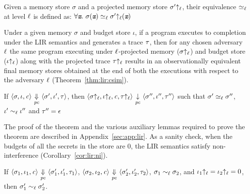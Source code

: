 \begin{mydef}
\label{def:lir:simseq}
Given a memory store $\sigma$ and a projected memory store
$\sigma'{\uparrow_\ell}$, their equivalence $\simeq_\ell$ at level
$\ell$ is defined as: 
$\forall \emph{\texttt{x}}.~ \sigma(\emph{\texttt{x}}) \simeq_\ell
\sigma'{\uparrow_\ell}(\emph{\texttt{x}})$ 
\end{mydef}


Under a given memory $\sigma$ and budget store
$\iota$, if a program executes to completion under the LIR semantics
and generates a trace $\tau$, then for any chosen adversary
$\ell$ the same program executing under $\ell$-projected 
memory ($\sigma{\uparrow_\ell}$) and budget store ($\iota{\uparrow_\ell}$) along with the
projected trace $\tau{\uparrow_\ell}$ results in an observationally equivalent
final memory stores obtained at the end of both the executions with
respect to the adversary $\ell$ (Theorem~\ref{thm:lir:csim}).

\begin{myThm}
\label{thm:lir:csim}
If 
$\langle \sigma, \iota, \mathit{c} \rangle {~\underset{\mathit{pc}}{\Downarrow}~} \langle \sigma', \iota',
\tau \rangle$,  then 
$\langle \sigma{\uparrow_\ell}, \iota{\uparrow_\ell}, \mathit{c}, \tau{\uparrow_\ell}
\rangle  {~\underset{\mathit{pc}}{\downarrow}~} \langle \sigma'',\iota'',
\tau'' \rangle$ such that $\sigma' \simeq_\ell \sigma''$,
$\iota' \sim_\ell \iota''$ and $\tau'' = \epsilon$
\end{myThm}

The proof of the theorem and the various auxiliary lemmas 
required to prove the theorem are described in
Appendix~\ref{sec:app:lir}.  As a sanity check, when the budgets of
all the secrets in the store are $0$, the LIR semantics satisfy
non-interference (Corollary~\ref{cor:lir:ni}). 

\begin{mycor}
\label{cor:lir:ni}
If $\langle \sigma_1, \iota_1, \mathit{c} \rangle
{~\underset{\mathit{pc}}{\Downarrow}~} \langle \sigma_1', \iota_1', \tau_1 \rangle$, 
 $\langle \sigma_2, \iota_2, \mathit{c} \rangle
{~\underset{\mathit{pc}}{\Downarrow}~} \langle \sigma_2', \iota_2', \tau_2 \rangle$, 
 $\sigma_1 \sim_\ell \sigma_2$, and $\iota_1{\uparrow_\ell} = \iota_2{\uparrow_\ell} = 0$, 
then $\sigma_1' \sim_\ell \sigma_2'$.
\end{mycor}

